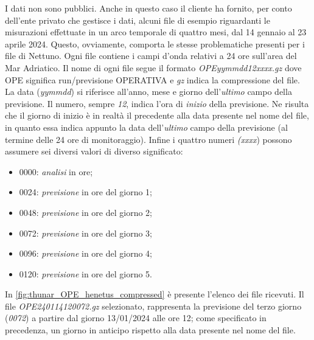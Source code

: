 \documentclass[./main.tex]{subfiles}
\begin{document}
I dati non sono pubblici. Anche in questo caso il cliente ha fornito, per conto dell'ente privato che gestisce i dati, alcuni file di esempio riguardanti le misurazioni effettuate in un arco temporale di quattro mesi, dal 14 gennaio al 23 aprile 2024. Questo, ovviamente, comporta le stesse problematiche presenti per i file di Nettuno. Ogni file contiene i campi d'onda relativi a 24 ore sull'area del Mar Adriatico. Il nome di ogni file segue il formato \textit{OPEyymmdd12xxxx.gz} dove OPE significa run/previsione OPERATIVA e \textit{gz} indica la compressione del file. La data (\textit{yymmdd}) si riferisce all'anno, mese e giorno dell'\textit{ultimo} campo della previsione. Il numero, sempre \textit{12}, indica l'ora di \textit{inizio} della previsione.  Ne risulta che il giorno di inizio è in realtà il precedente alla data presente nel nome del file, in quanto essa indica appunto la data dell'\textit{ultimo} campo della previsione (al termine delle 24 ore di monitoraggio). Infine i quattro numeri \textit{(xxxx}) possono assumere sei diversi valori di diverso significato:
\begin{itemize}
    \item 0000: \textit{analisi} in ore;
    \item 0024: \textit{previsione} in ore del giorno 1;
    \item 0048: \textit{previsione} in ore del giorno 2;
    \item 0072: \textit{previsione} in ore del giorno 3;
    \item 0096: \textit{previsione} in ore del giorno 4;
    \item 0120: \textit{previsione} in ore del giorno 5.
\end{itemize}

In \autoref{fig:thunar_OPE_henetus_compressed} è presente l'elenco dei file ricevuti. Il file \textit{OPE240114120072.gz} selezionato, rappresenta la previsione del terzo giorno (\textit{0072}) a partire dal giorno 13/01/2024 alle ore 12; come specificato in precedenza, un giorno in anticipo rispetto alla data presente nel nome del file.
\end{document}
